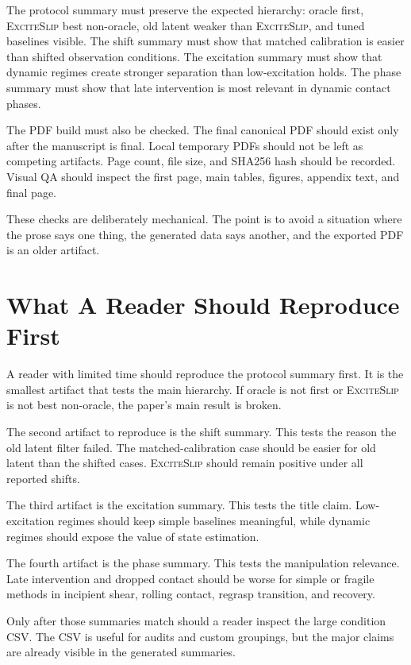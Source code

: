 \documentclass{article}
\newcommand{\method}{\textsc{ExciteSlip}\xspace}
\begin{document}
The protocol summary must preserve the expected hierarchy: oracle first, \method best non-oracle, old latent weaker than \method, and tuned baselines visible. The shift summary must show that matched calibration is easier than shifted observation conditions. The excitation summary must show that dynamic regimes create stronger separation than low-excitation holds. The phase summary must show that late intervention is most relevant in dynamic contact phases.

The PDF build must also be checked. The final canonical PDF should exist only after the manuscript is final. Local temporary PDFs should not be left as competing artifacts. Page count, file size, and SHA256 hash should be recorded. Visual QA should inspect the first page, main tables, figures, appendix text, and final page.

These checks are deliberately mechanical. The point is to avoid a situation where the prose says one thing, the generated data says another, and the exported PDF is an older artifact.

\section{What A Reader Should Reproduce First}

A reader with limited time should reproduce the protocol summary first. It is the smallest artifact that tests the main hierarchy. If oracle is not first or \method is not best non-oracle, the paper's main result is broken.

The second artifact to reproduce is the shift summary. This tests the reason the old latent filter failed. The matched-calibration case should be easier for old latent than the shifted cases. \method should remain positive under all reported shifts.

The third artifact is the excitation summary. This tests the title claim. Low-excitation regimes should keep simple baselines meaningful, while dynamic regimes should expose the value of state estimation.

The fourth artifact is the phase summary. This tests the manipulation relevance. Late intervention and dropped contact should be worse for simple or fragile methods in incipient shear, rolling contact, regrasp transition, and recovery.

Only after those summaries match should a reader inspect the large condition CSV. The CSV is useful for audits and custom groupings, but the major claims are already visible in the generated summaries.
\end{document}
